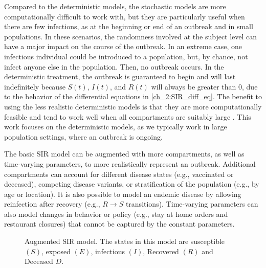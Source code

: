Compared to the deterministic models, the stochastic models are more computationally difficult to work with, but they are particularly useful when there are few infections, as at the beginning or end of an outbreak and in small populations.
In these scenarios, the randomness involved at the subject level can have a major impact on the course of the outbreak.
In an extreme case, one infectious individual could be introduced to a population, but, by chance, not infect anyone else in the population.
Then, no outbreak occurs.
In the deterministic treatment, the outbreak is guaranteed to begin and will last indefinitely because \( S(t) \), \(  I(t) \), and \( R(t) \) will always be greater than 0, due to the behavior of the differential equations in \eqref{ch_2:SIR_diff_eq}.
The benefit to using the less realistic deterministic models is that they are more computationally feasible and tend to work well when all compartments are suitably large \citep{doi:10.1098/rspb.2015.0347}.
This work focuses on the deterministic models, as we typically work in large population settings, where an outbreak is ongoing.

The basic SIR model can be augmented with more compartments, as well as time-varying parameters, to more realistically represent an outbreak.
Additional compartments can account for different disease states (e.g., vaccinated or deceased), competing disease variants, or stratification of the population (e.g., by age or location).
It is also possible to model an endemic disease by allowing reinfection after recovery (e.g., \(R \to S\) transitions).
Time-varying parameters can also model changes in behavior or policy (e.g., stay at home orders and restaurant closures) that cannot be captured by the constant parameters.

\begin{figure}
    \centering
    \caption[Augmented SIR model.]{
    Augmented SIR model.
    The states in this model are susceptible \( (S) \), exposed \( (E) \), infectious \( (I) \), Recovered \( (R) \) and Deceased \( D \).}
    \label{ch_2:fig:SEIRDS_diagram}
\end{figure}

